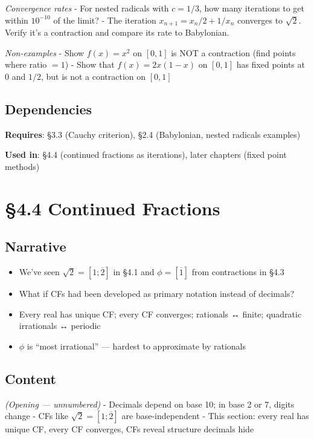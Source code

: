 \documentclass[
  10pt,
  letterpaper,
]{scrbook}
\providecommand{\tightlist}{%
  \setlength{\itemsep}{0pt}\setlength{\parskip}{0pt}}
\begin{document}
\emph{Convergence rates} - For nested radicals with \(c = 1/3\), how
many iterations to get within \(10^{-10}\) of the limit? - The iteration
\(x_{n+1} = x_n/2 + 1/x_n\) converges to \(\sqrt{2}\). Verify it's a
contraction and compare its rate to Babylonian.

\emph{Non-examples} - Show \(f(x) = x^2\) on \([0, 1]\) is NOT a
contraction (find points where ratio \(= 1\)) - Show that
\(f(x) = 2x(1-x)\) on \([0, 1]\) has fixed points at \(0\) and \(1/2\),
but is not a contraction on \([0, 1]\)

\subsection{Dependencies}\label{dependencies-17}

\textbf{Requires}: §3.3 (Cauchy criterion), §2.4 (Babylonian, nested
radicals examples)

\textbf{Used in}: §4.4 (continued fractions as iterations), later
chapters (fixed point methods)

\section{§4.4 Continued Fractions}\label{continued-fractions}

\subsection{Narrative}\label{narrative-18}

\begin{itemize}
\tightlist
\item
  We've seen \(\sqrt{2} = [1; \overline{2}]\) in §4.1 and
  \(\phi = [\overline{1}]\) from contractions in §4.3
\item
  What if CFs had been developed as primary notation instead of
  decimals?
\item
  Every real has unique CF; every CF converges; rationals ↔ finite;
  quadratic irrationals ↔ periodic
\item
  \(\phi\) is ``most irrational'' --- hardest to approximate by
  rationals
\end{itemize}

\subsection{Content}\label{content-18}

\emph{(Opening --- unnumbered)} - Decimals depend on base 10; in base 2
or 7, digits change - CFs like \(\sqrt{2} = [1; \overline{2}]\) are
base-independent - This section: every real has unique CF, every CF
converges, CFs reveal structure decimals hide
\end{document}
